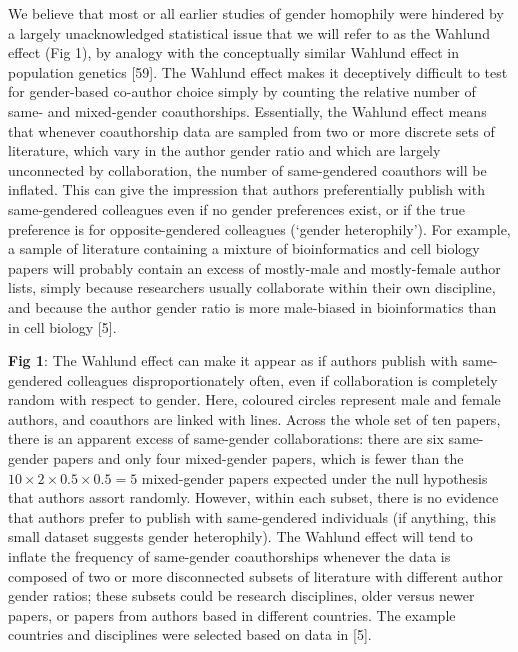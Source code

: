 \documentclass[12pt,]{article}
\begin{document}
We believe that most or all earlier studies of gender homophily were
hindered by a largely unacknowledged statistical issue that we will
refer to as the Wahlund effect (Fig 1), by analogy with the conceptually
similar Wahlund effect in population genetics {[}59{]}. The Wahlund
effect makes it deceptively difficult to test for gender-based co-author
choice simply by counting the relative number of same- and mixed-gender
coauthorships. Essentially, the Wahlund effect means that whenever
coauthorship data are sampled from two or more discrete sets of
literature, which vary in the author gender ratio and which are largely
unconnected by collaboration, the number of same-gendered coauthors will
be inflated. This can give the impression that authors preferentially
publish with same-gendered colleagues even if no gender preferences
exist, or if the true preference is for opposite-gendered colleagues
(`gender heterophily'). For example, a sample of literature containing a
mixture of bioinformatics and cell biology papers will probably contain
an excess of mostly-male and mostly-female author lists, simply because
researchers usually collaborate within their own discipline, and because
the author gender ratio is more male-biased in bioinformatics than in
cell biology {[}5{]}.

\vspace{2cm}

\textbf{Fig 1}: The Wahlund effect can make it appear as if authors
publish with same-gendered colleagues disproportionately often, even if
collaboration is completely random with respect to gender. Here,
coloured circles represent male and female authors, and coauthors are
linked with lines. Across the whole set of ten papers, there is an
apparent excess of same-gender collaborations: there are six same-gender
papers and only four mixed-gender papers, which is fewer than the
\(10\times2\times0.5\times0.5 = 5\) mixed-gender papers expected under
the null hypothesis that authors assort randomly. However, within each
subset, there is no evidence that authors prefer to publish with
same-gendered individuals (if anything, this small dataset suggests
gender heterophily). The Wahlund effect will tend to inflate the
frequency of same-gender coauthorships whenever the data is composed of
two or more disconnected subsets of literature with different author
gender ratios; these subsets could be research disciplines, older versus
newer papers, or papers from authors based in different countries. The
example countries and disciplines were selected based on data in
{[}5{]}. \vspace{2cm}
\end{document}
